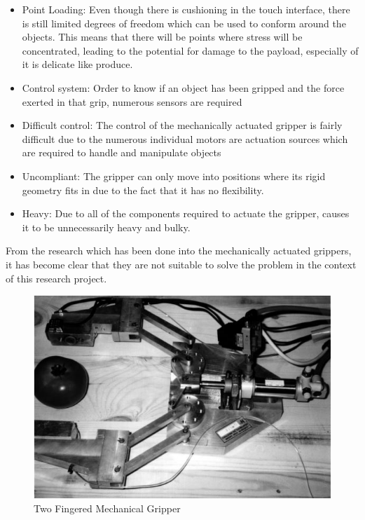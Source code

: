 \documentclass[11pt,twocolumn]{article}
\begin{document}
\begin{itemize}
\item Point Loading: Even though there is cushioning in the touch interface, there is still limited degrees of freedom which can be used to conform around the objects. This means that there will be points where stress will be concentrated, leading to the potential for damage to the payload, especially of it is delicate like produce.
\item Control system: Order to know if an object has been gripped and the force exerted in that grip, numerous sensors are required \cite{chiu2013development}
\item Difficult control: The control of the mechanically actuated gripper is fairly difficult due to the numerous individual motors are actuation sources which are required to handle and manipulate objects \cite{marchese2015recipe}
\item Uncompliant: The gripper can only move into positions where its rigid geometry fits in due to the  fact that it has no flexibility.
\item Heavy: Due to all of the components required to actuate the gripper, causes it to be unnecessarily heavy and bulky.
\end{itemize}
From the research which has been done into the mechanically actuated grippers, it has become clear that they are not suitable to solve the  problem in the context of this research project. 
\begin{figure}[h]
\centering
\includegraphics[scale=0.6]{Mechanical1}
\caption{Two Fingered Mechanical Gripper}
\label{fig:Mechanical1}
\end{figure}
\end{document}
